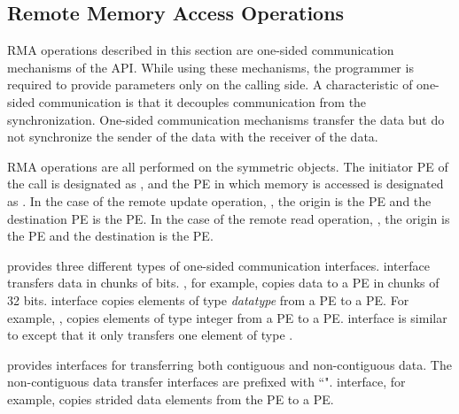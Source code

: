 \subsection{Remote Memory Access Operations}
\label{sec:rma}
\ac{RMA} operations described in this section are one-sided communication
mechanisms of the \openshmem{} \ac{API}. While using these mechanisms, the programmer is required to provide parameters only on the calling side. A characteristic of one-sided communication is that it decouples communication from
the synchronization. One-sided communication mechanisms transfer 
the data but do not synchronize the sender of the data with the receiver of the data. 

\openshmem{} \ac{RMA} operations are all performed on the symmetric objects. 
The initiator \ac{PE} of the call is designated as \source{}, and the 
\ac{PE} in which memory is accessed is designated as \target{}. In the case of the remote
update operation, \PUT{}, the origin is the \source{} \ac{PE} and the 
destination \ac{PE} is the \target{} PE. In the case of the remote read operation, \GET{}, 
the origin is the \target{} \ac{PE} and the destination is the \source{} \ac{PE}.

\openshmem{} provides three different types of one-sided communication interfaces. 
 interface transfers data in chunks 
of bits. , for example, copies data to a \target{} \ac{PE} in chunks of 32 bits.  interface copies elements of type 
\textit{datatype} from a \source{} \ac{PE} to a \target{} \ac{PE}. 
For example, , copies elements
of type integer from a \source{} \ac{PE} to a \target{} \ac{PE}. 
 interface is similar to  except that it only transfers one element of type .

\openshmem{} provides interfaces for transferring both contiguous and 
non-contiguous data. The non-contiguous data transfer interfaces are prefixed 
with ``".  interface, for example, copies strided data elements from the \source{} \ac{PE} to a \target{} \ac{PE}. 


